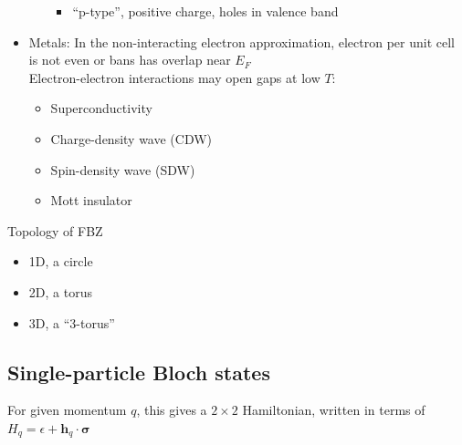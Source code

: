 \documentclass[11pt,letterpaper]{article}
\numberwithin{equation}{section} %
\renewcommand*{\vec}[1]{\bm{#1}}
\newcommand\e{\mathrm{e}}
\begin{document}
\begin{itemize}
\begin{itemize}
\begin{itemize}
			  \item ``p-type'', positive charge, holes in valence band
			\end{itemize}
	  \end{itemize}
  \item Metals: In the non-interacting electron approximation, electron per
	  unit cell is not even or bans has overlap near $E_F$\\
	  Electron-electron interactions may open gaps at low $T$: 
	  \begin{itemize}
	    \item Superconductivity
		\item Charge-density wave (CDW)
		\item Spin-density wave (SDW)
		\item Mott insulator
	  \end{itemize}
\end{itemize}

Topology of FBZ
\begin{itemize}
  \item 1D, a circle
  \item 2D, a torus
  \item 3D, a ``3-torus''
\end{itemize}


\subsection{Single-particle Bloch states}
\label{sub:single_particle_bloch_states}
\begin{center}
\end{center}
For given momentum $q$, this gives a $2\times 2$ Hamiltonian, written in
terms of $H_q = \epsilon + \vec h_q\cdot\vec\sigma$
\end{document}
